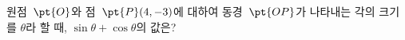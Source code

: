 원점~$\pt{O}$와 점~$\pt{P}(4{,}\mkern3mu\mathopen{}-3)$에 대하여 동경~$\pt{OP}$가 나타내는 각의 크기를 $\theta$라 할 때, $\sin\theta+\cos\theta$의 값은?
